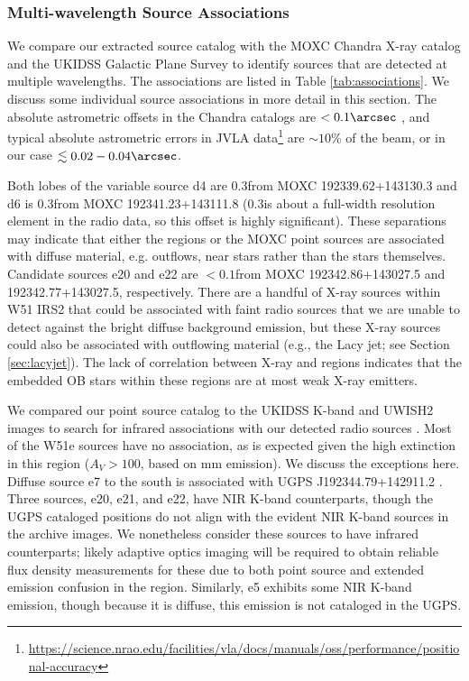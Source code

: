 \subsubsection{Multi-wavelength Source Associations}
\label{sec:associations}
We compare our extracted source catalog with the MOXC Chandra X-ray catalog
\citep{Townsley2014a} and the UKIDSS Galactic Plane Survey
\citep[UGPS;][]{Lucas2008a} to identify sources that are detected at multiple
wavelengths.  The associations are listed in Table
\ref{tab:associations}.  We discuss some
individual source associations in more detail in this section.
The absolute astrometric offsets in the Chandra catalogs are $<0.1\arcsec$
\citep{Townsley2014a}, and typical absolute astrometric errors in JVLA
data\footnote{\url{https://science.nrao.edu/facilities/vla/docs/manuals/oss/performance/positional-accuracy}}
are $\sim10\%$ of the beam, or in our case $\lesssim0.02-0.04\arcsec$.

Both lobes of the variable source d4 are
0.3\arcsec from MOXC 192339.62+143130.3 and d6 is 0.3\arcsec from MOXC
192341.23+143111.8 (0.3\arcsec is about a full-width resolution element in the
radio data, so this offset
is highly significant).    These
separations may indicate that either the \hii regions or the MOXC point sources
are associated with diffuse material, e.g. outflows,
near stars rather than the stars themselves.  
Candidate sources e20 and e22 are $<0.1$\arcsec from
MOXC 192342.86+143027.5 and 192342.77+143027.5, respectively.
There are a handful of X-ray
sources within W51 IRS2 that could be associated with faint radio sources that
we are unable to detect against the bright diffuse background emission, but
these X-ray sources could also be associated with
outflowing material (e.g., the Lacy jet; see Section \ref{sec:lacyjet}).  The
lack of correlation between X-ray and \hchii regions indicates that the
embedded OB stars within these \hchii regions are at most weak X-ray emitters.  

We compared our point source catalog to the UKIDSS K-band and UWISH2 \hh images
to search for infrared associations with our detected radio sources
\citep{Lucas2008a,Froebrich2011a}.  Most of the W51e sources have no
association, as is expected given the high extinction in this region
($A_V>100$, based on mm emission).  We discuss the exceptions here.  Diffuse
source e7 to the south is associated with UGPS
J192344.79+142911.2 \citep{Lucas2008a}.  Three sources, e20, e21, and
e22, have NIR K-band counterparts, though the UGPS cataloged positions do not
align with the evident NIR K-band sources in the archive images. We nonetheless
consider these sources
to have infrared counterparts; likely adaptive optics imaging will be required
to obtain reliable flux density measurements for these due to both point source
and extended emission confusion in the region.   Similarly, e5 exhibits some
NIR K-band emission, though because it is diffuse, this emission is
not cataloged in the UGPS.

